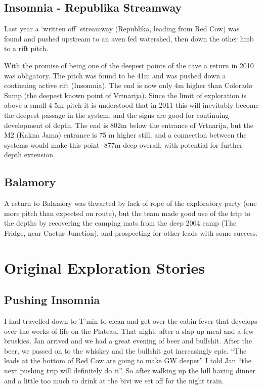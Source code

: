 \subsection{Insomnia - Republika Streamway}

Last year a `written off' streamway (Republika, leading from Red Cow)
was found and pushed upstream to an aven fed watershed, then down the
other limb to a rift pitch.

With the promise of being one of the deepest points of the cave a return
in 2010 was obligatory. The pitch was found to be 41m and was pushed
down a continuing active rift (Insomnia). The end is now only 4m higher
than Colorado Sump (the deepest known point of Vrtnarija). Since the
limit of exploration is above a small 4-5m pitch it is understood that
in 2011 this will inevitably become the deepest passage in the system,
and the signs are good for continuing development of depth. The end is
802m below the entrance of Vrtnarija, but the M2 (Kakna Jama) entrance
is 75 m higher still, and a connection between the systems would make
this point -877m deep overall, with potential for further depth
extension.

\subsection{Balamory}

A return to Balamory was thwarted by lack of rope of the exploratory
party (one more pitch than expected on route), but the team made good
use of the trip to the depths by recovering the camping mats from the
deep 2004 camp (The Fridge, near Cactus Junction), and prospecting for
other leads with some success.

\section{Original Exploration Stories}

\subsection{Pushing Insomnia}

I had travelled down to T'min to clean and get over the cabin fever that
develops over the weeks of life on the Plateau. That night, after a slap
up meal and a few bruskies, Jan arrived and we had a great evening of
beer and bullshit. After the beer, we passed on to the whiskey and the
bullshit got increasingly epic. ``The leads at the bottom of Red Cow are
going to make GW deeper'' I told Jan ``the next pushing trip will
definitely do it''. So after walking up the hill having dinner and a
little too much to drink at the bivi we set off for the night train.

